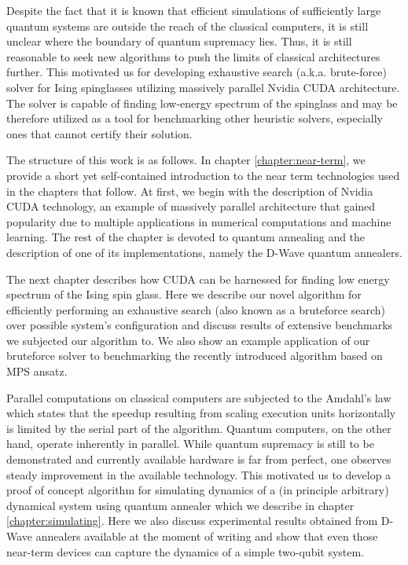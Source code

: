 Despite the fact that it is known that efficient simulations of sufficiently large quantum systems are outside the reach of the classical computers, it is still unclear where the boundary of quantum supremacy lies. Thus, it is still reasonable to seek new algorithms to push the limits of classical architectures further. This motivated us for developing exhaustive search (a.k.a. brute-force) solver for Ising spinglasses utilizing massively parallel Nvidia CUDA architecture. The solver is capable of finding low-energy spectrum of the spinglass and may be therefore utilized as a tool for benchmarking other heuristic solvers, especially ones that cannot certify their solution.

The structure of this work is as follows. In chapter \ref{chapter:near-term}, we provide a short yet self-contained introduction to the near term technologies used in the chapters that follow. At first, we begin with the description of Nvidia CUDA technology, an example of massively parallel architecture that gained popularity due to multiple applications in numerical computations and machine learning. The rest of the chapter is devoted to quantum annealing and the description of one of its implementations, namely the D-Wave quantum annealers.

The next chapter describes how CUDA can be harnessed for finding low energy spectrum of the Ising spin glass. Here we describe our novel algorithm for efficiently performing an exhaustive search (also known as a bruteforce search) over possible system's configuration and discuss results of extensive benchmarks we subjected our algorithm to. We also show an example application of our bruteforce solver to benchmarking the recently introduced algorithm based on MPS ansatz.

Parallel computations on classical computers are subjected to the Amdahl's law which states that the speedup resulting from scaling execution units horizontally is limited by the serial part of the algorithm. Quantum computers, on the other hand, operate inherently in parallel. While quantum supremacy is still to be demonstrated and currently available hardware is far from perfect, one observes steady improvement in the available technology. This motivated us to develop a proof of concept algorithm for simulating dynamics of a (in principle arbitrary) dynamical system using quantum annealer which we describe in chapter \ref{chapter:simulating}. Here we also discuss experimental results obtained from D-Wave annealers available at the moment of writing and show that even those near-term devices can capture the dynamics of a simple two-qubit system.